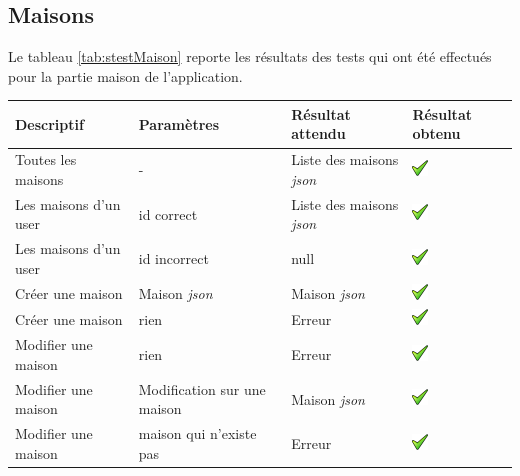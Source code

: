 \subsection{Maisons} %
\label{sub:login}
Le tableau \ref{tab:stestMaison} reporte les résultats des tests qui ont été effectués pour la partie maison de l'application.
\begin{table}[H]
\begin{tabularx}{\textwidth}{|X|X|X|X|}
  \hline
  \bf{Descriptif} & \bf{Paramètres} & \bf{Résultat attendu} & \bf{Résultat obtenu}\\
  \hline
  Toutes les maisons & - & Liste des maisons \emph{\gls{json}} & \includegraphics[width=16px]{00_media/ok.png} \\
  \hline
  Les maisons d'un user & id correct & Liste des maisons \emph{\gls{json}} & \includegraphics[width=16px]{00_media/ok.png} \\
  \hline
  Les maisons d'un user & id incorrect & null & \includegraphics[width=16px]{00_media/ok.png} \\
  \hline
   Créer une maison & Maison \emph{\gls{json}} & Maison \emph{\gls{json}} & \includegraphics[width=16px]{00_media/ok.png} \\
  \hline
  Créer une maison & rien & Erreur & \includegraphics[width=16px]{00_media/ok.png} \\
  \hline
   Modifier une maison & rien & Erreur & \includegraphics[width=16px]{00_media/ok.png} \\
  \hline
  Modifier une maison & Modification sur une maison & Maison \emph{\gls{json}} & \includegraphics[width=16px]{00_media/ok.png} \\
  \hline
  Modifier une maison & maison qui n'existe pas & Erreur & \includegraphics[width=16px]{00_media/ok.png} \\

\end{tabularx}
\end{table}
